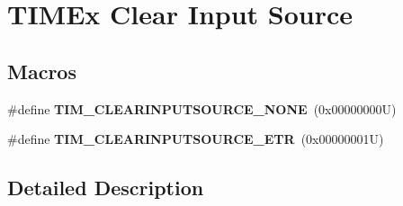 \hypertarget{group___t_i_m_ex___clock___clear___input___source}{}\section{T\+I\+M\+Ex Clear Input Source}
\label{group___t_i_m_ex___clock___clear___input___source}
\subsection*{Macros}
\begin{DoxyCompactItemize}
\item 
\mbox{\label{group___t_i_m_ex___clock___clear___input___source_ga48c5312aecd377fab00d62e9b4169e9e}} 
\#define {\bfseries T\+I\+M\+\_\+\+C\+L\+E\+A\+R\+I\+N\+P\+U\+T\+S\+O\+U\+R\+C\+E\+\_\+\+N\+O\+NE}~(0x00000000\+U)
\item 
\mbox{\label{group___t_i_m_ex___clock___clear___input___source_gaa28a8cf1db85cf6c845c6c1f02ba5c8e}} 
\#define {\bfseries T\+I\+M\+\_\+\+C\+L\+E\+A\+R\+I\+N\+P\+U\+T\+S\+O\+U\+R\+C\+E\+\_\+\+E\+TR}~(0x00000001\+U)
\end{DoxyCompactItemize}


\subsection{Detailed Description}
